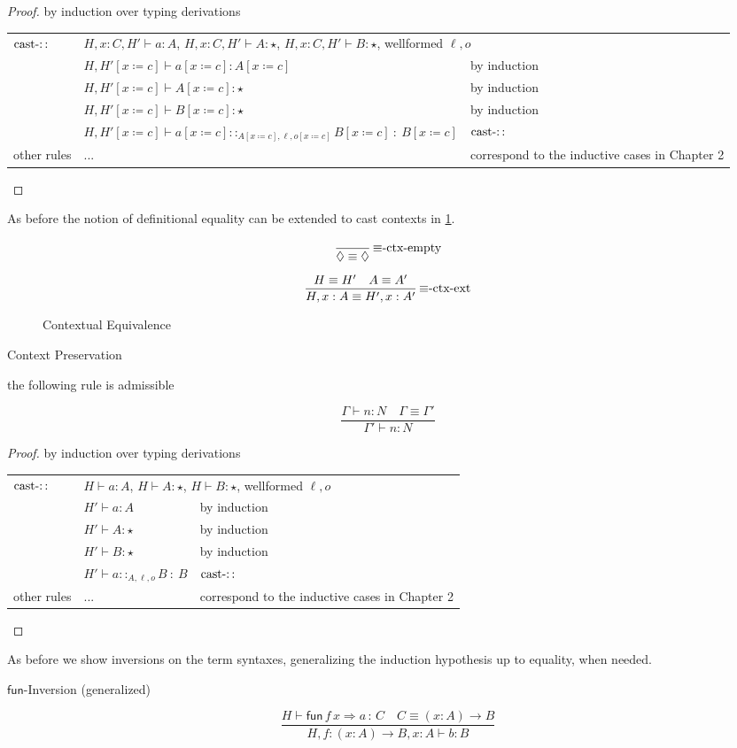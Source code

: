 \begin{proof}
by induction over typing derivations

\begin{tabular}{lll}
$\operatorname{cast-::}$ & \multicolumn{2}{l}{$H,x:C,H'\vdash a:A$, $H,x:C,H'\vdash A:\star$, $H,x:C,H'\vdash B:\star$,
wellformed $\ensuremath{\ell},o$}\tabularnewline
 & $H,H'\left[x\coloneqq c\right]\vdash a\left[x\coloneqq c\right]:A\left[x\coloneqq c\right]$ & by induction\tabularnewline
 & $H,H'\left[x\coloneqq c\right]\vdash A\left[x\coloneqq c\right]:\star$ & by induction\tabularnewline
 & $H,H'\left[x\coloneqq c\right]\vdash B\left[x\coloneqq c\right]:\star$ & by induction\tabularnewline
 & $H,H'\left[x\coloneqq c\right]\vdash a\left[x\coloneqq c\right]::_{A\left[x\coloneqq c\right],\ensuremath{\ell},o\left[x\coloneqq c\right]}B\left[x\coloneqq c\right]\::\:B\left[x\coloneqq c\right]$ & $\operatorname{cast-::}$\tabularnewline
other rules & ... & correspond to the inductive cases in Chapter 2\tabularnewline
\end{tabular}
\end{proof}
As before the notion of definitional equality can be extended to cast
contexts in \ref{fig:surface-Context-Equiv}.

\begin{figure}
\[
\frac{\ }{\lozenge\equiv\lozenge}\,\textrm{\ensuremath{\equiv}-ctx-empty}
\]

\[
\frac{H\equiv H'\quad A\equiv A'}{H,x:A\equiv H',x:A'}\,\textrm{\ensuremath{\equiv}-ctx-ext}
\]

\caption{Contextual Equivalence}
\label{fig:surface-Context-Equiv}
\end{figure}

\begin{lem}
Context Preservation

the following rule is admissible

\[
\frac{\Gamma\vdash n:N\quad\Gamma\equiv\Gamma'}{\Gamma'\vdash n:N}
\]
\end{lem}

\begin{proof}
by induction over typing derivations

\begin{tabular}{lll}
$\operatorname{cast-::}$ & \multicolumn{2}{l}{$H\vdash a:A$, $H\vdash A:\star$, $H\vdash B:\star$, wellformed
$\ensuremath{\ell},o$}\tabularnewline
 & $H'\vdash a:A$ & by induction\tabularnewline
 & $H'\vdash A:\star$ & by induction\tabularnewline
 & $H'\vdash B:\star$ & by induction\tabularnewline
 & $H'\vdash a::_{A,\ensuremath{\ell},o}B\::\:B$ & $\operatorname{cast-::}$\tabularnewline
other rules & ... & correspond to the inductive cases in Chapter 2\tabularnewline
\end{tabular}
\end{proof}
As before we show inversions on the term syntaxes, generalizing the
induction hypothesis up to equality, when needed.
\begin{lem}
$\mathsf{fun}$-Inversion (generalized)

\[
\frac{H\vdash\mathsf{fun}\,f\,x\Rightarrow a\,:\,C\quad C\equiv\left(x:A\right)\rightarrow B}{H,f:\left(x:A\right)\rightarrow B,x:A\vdash b:B}
\]
\end{lem}

